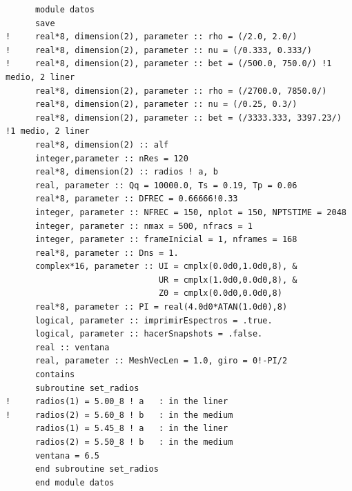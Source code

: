 \documentclass [11pt,spanish]{article}
\begin{document}
\begin{shaded}
\begin{verbatim}
      module datos
      save
!     real*8, dimension(2), parameter :: rho = (/2.0, 2.0/)
!     real*8, dimension(2), parameter :: nu = (/0.333, 0.333/)
!     real*8, dimension(2), parameter :: bet = (/500.0, 750.0/) !1 medio, 2 liner
      real*8, dimension(2), parameter :: rho = (/2700.0, 7850.0/)
      real*8, dimension(2), parameter :: nu = (/0.25, 0.3/)
      real*8, dimension(2), parameter :: bet = (/3333.333, 3397.23/) !1 medio, 2 liner
      real*8, dimension(2) :: alf
      integer,parameter :: nRes = 120
      real*8, dimension(2) :: radios ! a, b 
      real, parameter :: Qq = 10000.0, Ts = 0.19, Tp = 0.06
      real*8, parameter :: DFREC = 0.66666!0.33
      integer, parameter :: NFREC = 150, nplot = 150, NPTSTIME = 2048
      integer, parameter :: nmax = 500, nfracs = 1
      integer, parameter :: frameInicial = 1, nframes = 168
      real*8, parameter :: Dns = 1.
      complex*16, parameter :: UI = cmplx(0.0d0,1.0d0,8), &
                               UR = cmplx(1.0d0,0.0d0,8), &
                               Z0 = cmplx(0.0d0,0.0d0,8)
      real*8, parameter :: PI = real(4.0d0*ATAN(1.0d0),8)
      logical, parameter :: imprimirEspectros = .true.
      logical, parameter :: hacerSnapshots = .false.
      real :: ventana
      real, parameter :: MeshVecLen = 1.0, giro = 0!-PI/2
      contains
      subroutine set_radios
!     radios(1) = 5.00_8 ! a   : in the liner
!     radios(2) = 5.60_8 ! b   : in the medium
      radios(1) = 5.45_8 ! a   : in the liner
      radios(2) = 5.50_8 ! b   : in the medium
      ventana = 6.5
      end subroutine set_radios
      end module datos
\end{verbatim}
\end{shaded}
\endgroup
\end{document}

